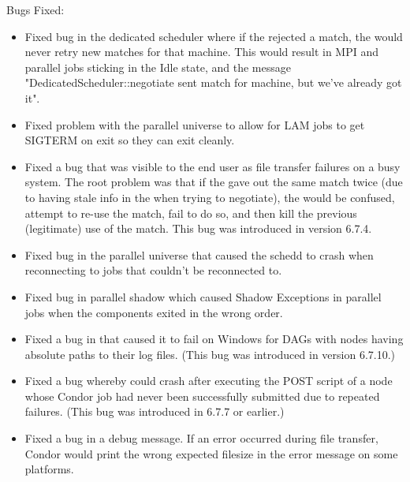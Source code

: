 \noindent Bugs Fixed:

\begin{itemize}


\item Fixed bug in the dedicated scheduler where if the  
rejected a match, the  would never retry new matches 
for that machine.  This would result in MPI and parallel jobs sticking 
in the Idle state, and the message "DedicatedScheduler::negotiate sent 
match for machine, but we've already got it".

\item Fixed problem with the parallel universe to allow for LAM jobs
to get SIGTERM on exit so they can exit cleanly.

\item Fixed a bug that was visible to the end user as file transfer
  failures on a busy system.
  The root problem was that if the  gave out the
  same match twice (due to having stale info in the 
  when trying to negotiate), the  would be confused,
  attempt to re-use the match, fail to do so, and then kill the
  previous (legitimate) use of the match.
  This bug was introduced in version 6.7.4.

\item Fixed bug in the parallel universe that caused the schedd to
crash when reconnecting to jobs that couldn't be reconnected to.

\item Fixed bug in parallel shadow which caused Shadow Exceptions
in parallel jobs when the components exited in the wrong order.

\item Fixed a bug in  that caused it to fail on Windows
for DAGs with nodes having absolute paths to their log files.  (This bug
was introduced in version 6.7.10.)

\item Fixed a bug whereby  could crash after executing
the POST script of a node whose Condor job had never been successfully
submitted due to repeated  failures.  (This bug was
introduced in 6.7.7 or earlier.)

\item Fixed a bug in a debug message.  If an error occurred during file
transfer, Condor would print the wrong expected filesize in the error message
on some platforms.


\end{itemize}
